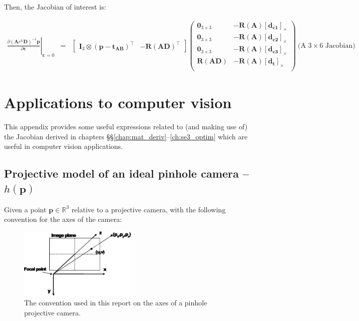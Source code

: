 \documentclass[a4paper,11pt]{report}
\newcommand{\E}{{\bm{\varepsilon}}}
\newcommand{\A}{{\mathbf{A}}}
\newcommand{\D}{{\mathbf{D}}}
\newcommand{\I}{{\mathbf{I}}}
\begin{document}
Then, the Jacobian of interest is:

\begin{eqnarray}
\left. \frac{\partial (\A e^\E \D)^{-1} \mathbf{p}}{\partial \E} \right|_{\E = 0}
&=&
\left[
\begin{array}{cc}
 \I_3 \otimes (\mathbf{p}-\mathbf{t_{AB}})^\top  & -\mathbf{R}(\A\D)^\top
\end{array}
\right]
\left(
\begin{array}{cc}
 \mathbf{0}_{3\times 3}  & -\mathbf{R}(\A) [\mathbf{d_{c1}}]_\times \\
 \mathbf{0}_{3\times 3}  & -\mathbf{R}(\A) [\mathbf{d_{c2}}]_\times \\
 \mathbf{0}_{3\times 3}  & -\mathbf{R}(\A) [\mathbf{d_{c3}}]_\times \\
 \mathbf{R}(\A\D)        & -\mathbf{R}(\A) [\mathbf{d_{t}}]_\times \\
\end{array}
\right)
~ \text{(A $3 \times 6$ Jacobian)} \nonumber
\end{eqnarray}



\appendix

\chapter{Applications to computer vision}
\label{ch:apx:cv}

This appendix provides some useful expressions related to (and making use of) 
the Jacobian derived in chapters \S\S\ref{chap:mat_deriv}--\ref{ch:se3_optim} 
which are useful
in computer vision applications.


\section{Projective model of an ideal pinhole camera -- $h(\mathbf{p})$}

Given a point $\mathbf{p} \in \mathbb{R}^3$ relative to a 
projective camera, with the following convention for the axes of the 
camera:

\begin{figure}[h!]
\centering
\includegraphics[width=0.50\textwidth]{imgs/pinhole_model.eps}
\caption{The convention used in this report on the axes of a pinhole projective camera.}
\label{fig:pinhole}
\end{figure}
\end{document}
